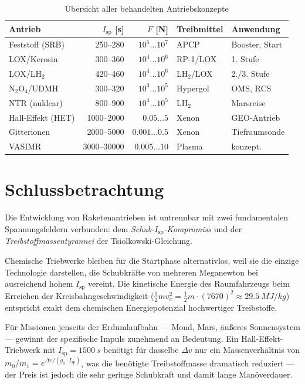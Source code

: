 ﻿\documentclass[12pt,a4paper]{article}
\newcommand{\Isp}{I_{\mathrm{sp}}}
\newcommand{\Dv}{\Delta v}
\begin{document}
\begin{table}[H]
\centering
\caption{Übersicht aller behandelten Antriebskonzepte}
\label{tab:uebersicht}
\begin{tabular}{lrrll}
\toprule
\textbf{Antrieb} & \textbf{$\Isp$ [s]} & \textbf{$F$ [N]} &
\textbf{Treibmittel} & \textbf{Anwendung}\\
\midrule
Feststoff (SRB)   & 250--280  & $10^5\ldots10^7$ & APCP     & Booster, Start\\
LOX/Kerosin       & 300--360  & $10^4\ldots10^6$ & RP-1/LOX & 1. Stufe\\
LOX/LH$_2$        & 420--460  & $10^4\ldots10^6$ & LH$_2$/LOX& 2./3. Stufe\\
N$_2$O$_4$/UDMH   & 300--320  & $10^3\ldots10^5$ & Hypergol & OMS, RCS\\
NTR (nuklear)     & 800--900  & $10^4\ldots10^5$ & LH$_2$   & Marsreise\\
Hall-Effekt (HET) & 1000--2000 & $0.05\ldots5$   & Xenon    & GEO-Antrieb\\
Gitterionen       & 2000--5000 & $0.001\ldots0.5$& Xenon    & Tiefraumsonde\\
VASIMR            & 3000--30000& $0.005\ldots10$ & Plasma   & konzept.\\
\bottomrule
\end{tabular}
\end{table}

\section{Schlussbetrachtung}

Die Entwicklung von Raketenantrieben ist untrennbar mit zwei fundamentalen Spannungsfeldern
verbunden: dem \emph{Schub-$\Isp$-Kompromiss} und der \emph{Treibstoffmassentyrannei}
der Tsiolkowski-Gleichung.

Chemische Triebwerke bleiben für die Startphase alternativlos, weil sie die einzige
Technologie darstellen, die Schubkräfte von mehreren Meganewton bei ausreichend hohem
$\Isp$ vereint. Die kinetische Energie des Raumfahrzeugs beim Erreichen der
Kreisbahngeschwindigkeit ($\frac{1}{2}mv_c^2 = \frac{1}{2}m\cdot(7670)^2 \approx
\SI{29.5}{MJ/kg}$) entspricht exakt dem chemischen Energiepotenzial hochwertiger
Treibstoffe.

Für Missionen jenseits der Erdumlaufbahn --- Mond, Mars, äußeres Sonnensystem ---
gewinnt der spezifische Impuls zunehmend an Bedeutung. Ein Hall-Effekt-Triebwerk
mit $\Isp = \SI{1500}{s}$ benötigt für dasselbe $\Dv$ nur ein Massenverhältnis von
$m_0/m_1 = e^{\Dv/(g_0\cdot\Isp)}$, was die benötigte Treibstoffmasse dramatisch
reduziert --- der Preis ist jedoch die sehr geringe Schubkraft und damit lange
Manöverdauer.
\end{document}
